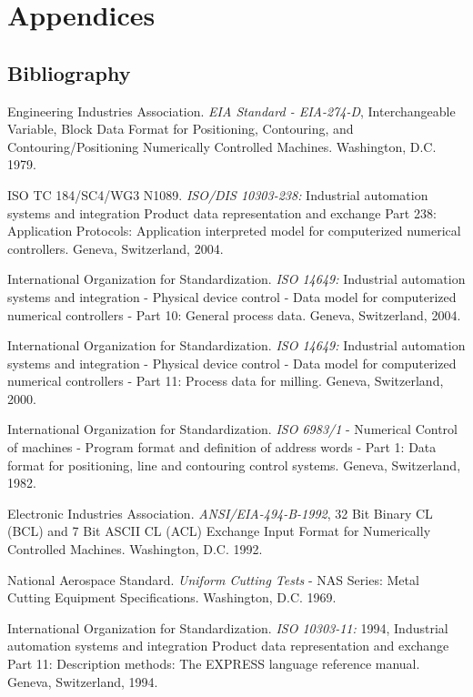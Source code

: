 \documentclass{mtconnect}	%
\begin{document}
\appendix
\section*{Appendices}
\renewcommand{\thesubsection}{\Alph{subsection}}

\subsection{Bibliography}
\label{Bibliography}

Engineering Industries Association. \textit{EIA Standard - EIA-274-D}, Interchangeable Variable, Block Data Format for Positioning, Contouring, and Contouring/Positioning Numerically Controlled Machines. Washington, D.C. 1979.

ISO TC 184/SC4/WG3 N1089. \textit{ISO/DIS 10303-238:} Industrial automation systems and integration  Product data representation and exchange  Part 238: Application Protocols: Application interpreted model for computerized numerical controllers. Geneva, Switzerland, 2004.

International Organization for Standardization. \textit{ISO 14649:} Industrial automation systems and integration - Physical device control - Data model for computerized numerical controllers - Part 10: General process data. Geneva, Switzerland, 2004.

International Organization for Standardization. \textit{ISO 14649:} Industrial automation systems and integration - Physical device control - Data model for computerized numerical controllers - Part 11: Process data for milling. Geneva, Switzerland, 2000.

International Organization for Standardization. \textit{ISO 6983/1} - Numerical Control of machines - Program format and definition of address words - Part 1: Data format for positioning, line and contouring control systems. Geneva, Switzerland, 1982.

Electronic Industries Association. \textit{ANSI/EIA-494-B-1992}, 32 Bit Binary CL (BCL) and 7 Bit ASCII CL (ACL) Exchange Input Format for Numerically Controlled Machines. Washington, D.C. 1992.

National Aerospace Standard. \textit{Uniform Cutting Tests} - NAS Series: Metal Cutting Equipment Specifications. Washington, D.C. 1969.

International Organization for Standardization. \textit{ISO 10303-11:} 1994, Industrial automation systems and integration  Product data representation and exchange  Part 11: Description methods: The EXPRESS language reference manual. Geneva, Switzerland, 1994.
\end{document}
